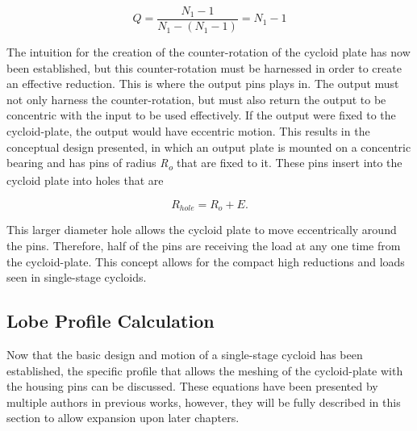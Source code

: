 \begin{equation} \label{eq:single_stage_ratio}
Q = \frac{N_1-1} {N_1 - (N_1 - 1)} = N_1 -1
\end{equation}

The intuition for the creation of the counter-rotation of the cycloid plate has now been established, but this counter-rotation must be harnessed in order to create an effective reduction. This is where the output pins plays in. The output must not only harness the counter-rotation, but must also return the output to be concentric with the input to be used effectively. If the output were fixed to the cycloid-plate, the output would have eccentric motion. This results in the conceptual design presented, in which an output plate is mounted on a concentric bearing and has pins of radius \textit{R\textsubscript{o}} that are fixed to it. These pins insert into the cycloid plate into holes that are 

\begin{equation} \label{eq:pin_hole_diam}
R_{hole} = R_o + E.
\end{equation}

This larger diameter hole allows the cycloid plate to move eccentrically around the pins. Therefore, half of the pins are receiving the load at any one time from the cycloid-plate. This concept allows for the compact high reductions and loads seen in single-stage cycloids. 

\subsection{Lobe Profile Calculation} \label{ch:design:basic_calc:profile}

Now that the basic design and motion of a single-stage cycloid has been established, the specific profile that allows the meshing of the cycloid-plate with the housing pins can be discussed. These equations have been presented by multiple authors in previous works, however, they will be fully described in this section to allow expansion upon later chapters. 

